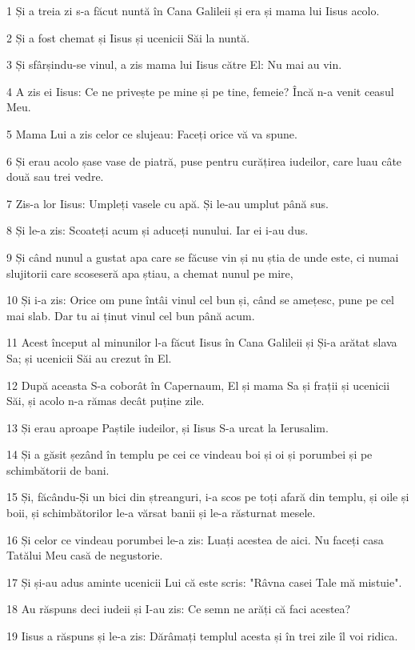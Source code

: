 \par 1 Și a treia zi s-a făcut nuntă în Cana Galileii și era și mama lui Iisus acolo.
\par 2 Și a fost chemat și Iisus și ucenicii Săi la nuntă.
\par 3 Și sfârșindu-se vinul, a zis mama lui Iisus către El: Nu mai au vin.
\par 4 A zis ei Iisus: Ce ne privește pe mine și pe tine, femeie? Încă n-a venit ceasul Meu.
\par 5 Mama Lui a zis celor ce slujeau: Faceți orice vă va spune.
\par 6 Și erau acolo șase vase de piatră, puse pentru curățirea iudeilor, care luau câte două sau trei vedre.
\par 7 Zis-a lor Iisus: Umpleți vasele cu apă. Și le-au umplut până sus.
\par 8 Și le-a zis: Scoateți acum și aduceți nunului. Iar ei i-au dus.
\par 9 Și când nunul a gustat apa care se făcuse vin și nu știa de unde este, ci numai slujitorii care scoseseră apa știau, a chemat nunul pe mire,
\par 10 Și i-a zis: Orice om pune întâi vinul cel bun și, când se amețesc, pune pe cel mai slab. Dar tu ai ținut vinul cel bun până acum.
\par 11 Acest început al minunilor l-a făcut Iisus în Cana Galileii și Și-a arătat slava Sa; și ucenicii Săi au crezut în El.
\par 12 După aceasta S-a coborât în Capernaum, El și mama Sa și frații și ucenicii Săi, și acolo n-a rămas decât puține zile.
\par 13 Și erau aproape Paștile iudeilor, și Iisus S-a urcat la Ierusalim.
\par 14 Și a găsit șezând în templu pe cei ce vindeau boi și oi și porumbei și pe schimbătorii de bani.
\par 15 Și, făcându-Și un bici din ștreanguri, i-a scos pe toți afară din templu, și oile și boii, și schimbătorilor le-a vărsat banii și le-a răsturnat mesele.
\par 16 Și celor ce vindeau porumbei le-a zis: Luați acestea de aici. Nu faceți casa Tatălui Meu casă de negustorie.
\par 17 Și și-au adus aminte ucenicii Lui că este scris: "Râvna casei Tale mă mistuie".
\par 18 Au răspuns deci iudeii și I-au zis: Ce semn ne arăți că faci acestea?
\par 19 Iisus a răspuns și le-a zis: Dărâmați templul acesta și în trei zile îl voi ridica.
